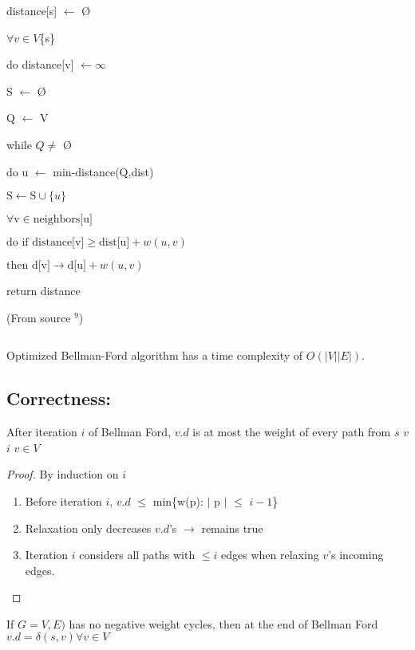 \documentclass{article}
\begin{document}
distance[s] $\leftarrow$ \O

$\forall v \in V$\textemdash\{s\}

\hspace{5 pt} do distance[v] $\leftarrow \infty$

S $\leftarrow$ \O

Q $\leftarrow$ V

while $Q \neq$ \O

do u $\leftarrow$ min-distance(Q,dist)

\hspace{5 pt} $\text{S} \leftarrow \text{S} \cup \{u\}$

\hspace{5 pt}\hspace{5 pt} $\forall \text{v} \in \text{neighbors[u]}$

\hspace{5 pt}\hspace{5 pt}\hspace{5 pt} $\text{do if distance[v]} \geq \text{dist[u]} + w(u,v)$

\hspace{5 pt}\hspace{5 pt}\hspace{5 pt}\hspace{5 pt} $\text{then d[v]} \rightarrow \text{d[u]} + w(u, v)$

return distance

(From source $^9$)
\begin{verbatim}

\end{verbatim}

Optimized Bellman-Ford algorithm has a time complexity of $O(|V||E|)$.

\subsection{Correctness:}
After iteration $i$ of Bellman Ford, $v.d$ is at most the weight of every path from  $s$  $v$  $i$  $v \in V$
\begin{proof}
By induction on $i$
\begin{enumerate}
\item Before iteration $i$, $v.d$ $\leq$ min\{w(p):\hspace{1 pt} $\mid$ p $\mid$ $\leq$ $i-1$\} 

\item Relaxation only decreases $v.d$'s $\rightarrow$ remains true

\item Iteration $i$ considers all paths with $\leq i$ edges when relaxing
$v$'s incoming edges.
\end{enumerate}
\end{proof}
If $G=V,E)$ has no negative weight cycles, then at the end of Bellman Ford $v.d = \delta(s,v) \forall v \in V$
\end{document}

